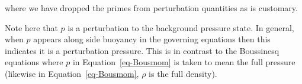 \documentclass[
  letterpaper,
  twocolumn,
  landscape]{report}
\begin{document}
where we have dropped the primes from perturbation quantities as is
customary.

\begin{tcolorbox}[enhanced jigsaw, toprule=.15mm, left=2mm, opacityback=0, breakable, arc=.35mm, colback=white, rightrule=.15mm, bottomrule=.15mm, colframe=quarto-callout-note-color-frame, leftrule=.75mm]
\begin{minipage}[t]{5.5mm}
\textcolor{quarto-callout-note-color}{\faInfo}
\end{minipage}%
\begin{minipage}[t]{\textwidth - 5.5mm}

Note here that \(p\) is a perturbation to the background pressure state.
In general, when \(p\) appears along side buoyancy in the governing
equations then this indicates it is a perturbation pressure. This is in
contrast to the Boussinesq equations where \(p\) in
Equation~\ref{eq-Bousmom} is taken to mean the full pressure (likewise
in Equation~\ref{eq-Bousmom}, \(\rho\) is the full density).

\end{minipage}%
\end{tcolorbox}
\end{document}

